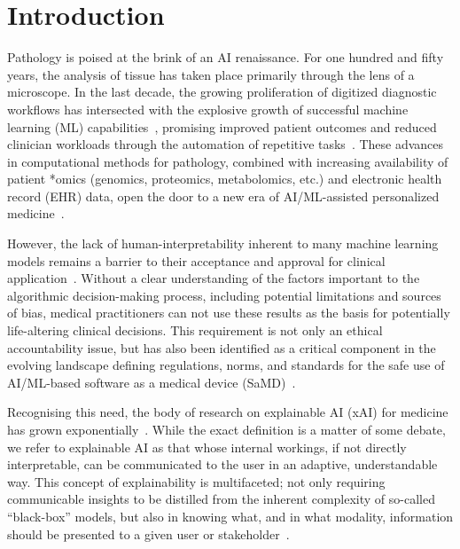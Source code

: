 \documentclass[final,5p,times,twocolumn,hyphens]{elsarticle}
\begin{document}
\section{Introduction}
\label{sec:introduction}

Pathology is poised at the brink of an AI renaissance. For one hundred and fifty years, the analysis of tissue has taken place primarily through the lens of a microscope. In the last decade, the growing proliferation of digitized diagnostic workflows has intersected with the explosive growth of successful machine learning (ML) capabilities~\cite{Pantanowitz:2010:DigitalPathology,PantanowitzEtAl:2021:AIPatho}, promising improved patient outcomes and reduced clinician workloads through the automation of repetitive tasks~\cite{das2020computer}. These advances in computational methods for pathology, combined with increasing availability of patient *omics (genomics, proteomics, metabolomics, etc.) and electronic health record (EHR) data, open the door to a new era of AI/ML-assisted personalized medicine~\cite{acs2020artificial,holzinger_artificial_2020}.

However, the lack of human-interpretability inherent to many machine learning models remains a barrier to their acceptance and approval for clinical application~\cite{cui2021artificial}. Without a clear understanding of the factors important to the algorithmic decision-making process, including potential limitations and sources of bias, medical practitioners can not use these results as the basis for potentially life-altering clinical decisions. This requirement is not only an ethical accountability issue, but has also been identified as a critical component in the evolving landscape defining regulations, norms, and standards for the safe use of AI/ML-based software as a medical device (SaMD)~\cite{EU_White, ISO_IEC_TR_24028}.

Recognising this need, the body of research on explainable AI (xAI) for medicine has grown exponentially~\cite{tjoa_survey_2020,poceviciute_survey_2020}. While the exact definition is a matter of some debate, we refer to explainable AI as that whose internal workings, if not directly interpretable, can be communicated to the user in an adaptive, understandable way. This concept of explainability is multifaceted; not only requiring communicable insights to be distilled from the inherent complexity of so-called ``black-box'' models, but also in knowing what, and in what modality, information should be presented to a given user or stakeholder~\cite{HolzingerEtAl:2020:QualityOfExplanations,zednik2019solving}.
\end{document}
